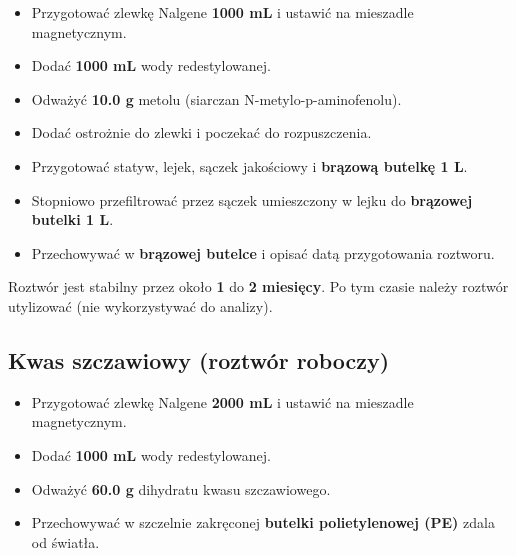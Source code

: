 \documentclass[
  letterpaper,
  DIV=11,
  numbers=noendperiod]{scrreprt}
\providecommand{\tightlist}{%
  \setlength{\itemsep}{0pt}\setlength{\parskip}{0pt}}\usepackage{longtable,booktabs,array}
\begin{document}
\begin{itemize}
\tightlist
\item
  Przygotować zlewkę Nalgene \textbf{1000 mL} i ustawić na mieszadle
  magnetycznym.
\item
  Dodać \textbf{1000 mL} wody redestylowanej.
\item
  Odważyć \textbf{10.0 g} metolu (siarczan N-metylo-p-aminofenolu).
\item
  Dodać ostrożnie do zlewki i poczekać do rozpuszczenia.
\item
  Przygotować statyw, lejek, sączek jakościowy i \textbf{brązową butelkę
  1 L}.
\item
  Stopniowo przefiltrować przez sączek umieszczony w lejku do
  \textbf{brązowej butelki 1 L}.
\item
  Przechowywać w \textbf{brązowej butelce} i opisać datą przygotowania
  roztworu.
\end{itemize}

\begin{tcolorbox}[enhanced jigsaw, toptitle=1mm, bottomtitle=1mm, opacitybacktitle=0.6, colframe=quarto-callout-important-color-frame, bottomrule=.15mm, title=\textcolor{quarto-callout-important-color}{\faExclamation}\hspace{0.5em}{Uwaga}, colbacktitle=quarto-callout-important-color!10!white, left=2mm, breakable, rightrule=.15mm, colback=white, opacityback=0, arc=.35mm, coltitle=black, leftrule=.75mm, toprule=.15mm, titlerule=0mm]

Roztwór jest stabilny przez około \textbf{1} do \textbf{2 miesięcy}. Po
tym czasie należy roztwór utylizować (nie wykorzystywać do analizy).

\end{tcolorbox}

\hypertarget{kwas-szczawiowy-roztwuxf3r-roboczy}{%
\subsection{Kwas szczawiowy (roztwór
roboczy)}\label{kwas-szczawiowy-roztwuxf3r-roboczy}}

\begin{itemize}
\tightlist
\item
  Przygotować zlewkę Nalgene \textbf{2000 mL} i ustawić na mieszadle
  magnetycznym.
\item
  Dodać \textbf{1000 mL} wody redestylowanej.
\item
  Odważyć \textbf{60.0 g} dihydratu kwasu szczawiowego.
\item
  Przechowywać w szczelnie zakręconej \textbf{butelki polietylenowej
  (PE)} zdala od światła.
\end{itemize}
\end{document}
